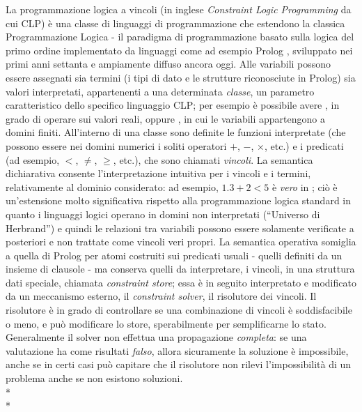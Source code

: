 La programmazione logica a vincoli \cite{clpSurvey} (in inglese \emph{Constraint Logic Programming} da cui CLP) è una classe di linguaggi di programmazione che estendono la classica Programmazione Logica - il paradigma di programmazione basato sulla logica del primo ordine implementato da linguaggi come ad esempio Prolog \cite{Colmerauer,Kowalski,clocksin2003programming}, sviluppato nei primi anni settanta e ampiamente diffuso ancora oggi. Alle variabili possono essere assegnati sia termini (i tipi di dato e le strutture riconosciute in Prolog) sia valori interpretati, appartenenti a una determinata \emph{classe}, un parametro caratteristico dello specifico linguaggio CLP; per esempio è possibile avere \clpr \cite{clpR}, in grado di operare sui valori reali, oppure \clpfd, in cui le variabili appartengono a domini finiti. All'interno di una classe sono definite le funzioni interpretate (che possono essere nei domini numerici i soliti operatori $+$, $-$, $\times$, etc.) e i predicati (ad esempio, $<$, $\neq$, $\geq$, etc.), che sono chiamati \emph{vincoli}. La semantica dichiarativa consente l'interpretazione intuitiva per i vincoli e i termini, relativamente al dominio considerato: ad esempio, $1.3+2<5$ è \emph{vero} in \clpr; ciò è un'estensione molto significativa rispetto alla programmazione logica standard in quanto i linguaggi logici operano in domini non interpretati (``Universo di Herbrand'') e quindi le relazioni tra variabili possono essere solamente verificate a posteriori e non trattate come vincoli veri propri. La semantica operativa somiglia a quella di Prolog per atomi costruiti sui predicati usuali - quelli definiti da un insieme di clausole - ma conserva quelli da interpretare, i vincoli, in una struttura dati speciale, chiamata \emph{constraint store}; essa è in seguito interpretato e modificato da un meccanismo esterno, il \emph{constraint solver}, il risolutore dei vincoli. Il risolutore è in grado di controllare se una combinazione di vincoli è soddisfacibile o meno, e può modificare lo store, sperabilmente per semplificarne lo stato. Generalmente il solver non effettua una propagazione \emph{completa}: se una valutazione ha come risultati \emph{falso}, allora sicuramente la soluzione è impossibile, anche se in certi casi può capitare che il risolutore non rilevi l'impossibilità di un problema anche se non esistono soluzioni.\\*\\*  
